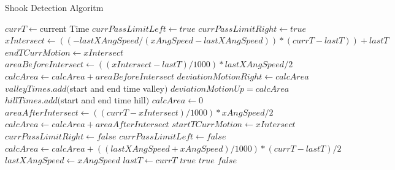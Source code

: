 \begin{algorithm}
	\caption{Shook Detection Algoritm}
	\label{alg:algoritma-pendeteksi-gerakan-menggeleng}
	\begin{algorithmic}[1]
		\State $currT \gets $current Time
			\State $currPassLimitLeft \gets true$
			\State $currPassLimitRight \gets true$
		\EndIf
			\State $xIntersect \gets ((-lastXAngSpeed / (xAngSpeed - lastXAngSpeed)) * (currT - lastT))+lastT$
			\State $endTCurrMotion \gets xIntersect$
			\State $areaBeforeIntersect \gets ((xIntersect - lastT) / 1000) * lastXAngSpeed / 2$
			\State $calcArea \gets calcArea + areaBeforeIntersect$
				\State $deviationMotionRight \gets calcArea$
					\State $valleyTimes.add($start and end time valley$)$
				\EndIf
				\State $deviationMotionUp = calcArea$
					\State $hillTimes.add($start and end time hill$)$
				\EndIf
			\EndIf
			\State $calcArea \gets 0$
			\State $areaAfterIntersect \gets ((currT - xIntersect) / 1000) * xAngSpeed / 2$ 
			\State $calcArea \gets calcArea + areaAfterIntersect$ 
			\State $startTCurrMotion \gets xIntersect$ 
			\State $currPassLimitRight \gets false$ 
			\State $currPassLimitLeft \gets false$ 
		\Else 
			\State $calcArea \gets calcArea + ((lastXAngSpeed + xAngSpeed) / 1000) * (currT - lastT) / 2$
		\EndIf
		\State $lastXAngSpeed \gets xAngSpeed$
		\State $lastT \gets currT$
			\Return $true$ 
			\Return $true$
		\Else 
			\Return $false$
		\EndIf
	\EndFunction  
	\end{algorithmic}
\end{algorithm} 

